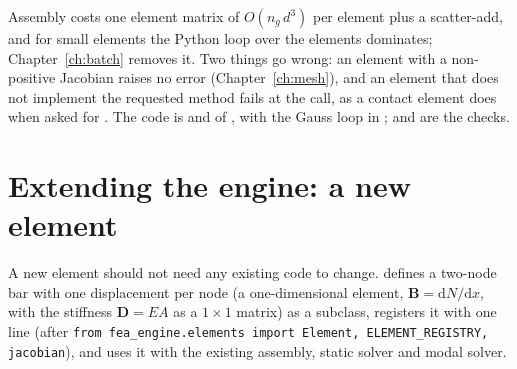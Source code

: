 Assembly costs one element matrix of $O(n_g\,d^3)$ per element plus a scatter-add, and for small elements the Python loop over the elements dominates; Chapter~\ref{ch:batch} removes it. Two things go wrong: an element with a non-positive Jacobian raises no error (Chapter~\ref{ch:mesh}), and an element that does not implement the requested method fails at the call, as a contact element does when asked for . The code is  and  of , with the Gauss loop in ;  and  are the checks.

\section{Extending the engine: a new element}\label{sec:ar-extend}

A new element should not need any existing code to change.  defines a two-node bar with one displacement per node (a one-dimensional element, $\bm B=\mathrm dN/\mathrm dx$, with the stiffness $\bm D=EA$ as a $1\times1$ matrix) as a subclass, registers it with one line (after \texttt{from fea\_engine.elements import Element, ELEMENT\_REGISTRY, jacobian}), and uses it with the existing assembly, static solver and modal solver.

